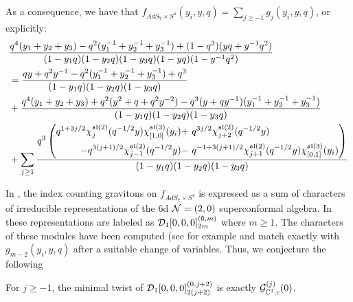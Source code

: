 \parsec[]
As a consequence, we have that $f_{AdS_7\times S^4} (y_i, y, q) = \sum_{j\geq -1} g_j (y_i, y, q)$, or explicitly:
\begin{align*}
& \frac{q^4(y_1+y_2+y_3)-q^2(y_1^{-1} + y_2^{-1} + y_3^{-1})+ (1-q^3)(yq + y^{-1} q^2)}{(1-y_1 q)(1-y_2 q)(1-y_3 q)(1-yq)(1-y^{-1} q^2)}  \\ 
& =  \frac{qy + q^2y^{-1} - q^2(y^{-1}_1+y^{-1}_2+y^{-1}_3) + q^3}{(1-y_1q) (1-y_2 q) (1-y_3 q)} \\
& +  \frac{q^4(y_1+y_2+y_3) + q^2 (y^2 + q + q^2 y^{-2}) - q^{3} (y + q y^{-1})(y_1^{-1} + y_2^{-1} + y_3^{-1})}{(1-y_1q) (1-y_2 q) (1-y_3 q)} \\
& + \sum_{j\geq 1} \frac{ q^{3} \left( \begin{aligned} q^{1 + 3 j/2} \chi^{\mathfrak{sl}(2)}_{j}(q^{-1/2} y)\chi^{\mathfrak{sl}(3)}_{[1,0]}(y_i) + \  & q^{3j/2} \chi^{\mathfrak{sl}(2)}_{j+2}(q^{-1/2} y)  \\
 - q^{3(j+1)/2} \chi^{\mathfrak{sl}(2)}_{j-1}(q^{-1/2}y) - \ & q^{-1 + 3(j+1)/2} \chi^{\mathfrak{sl}(2)}_{j+1} (q^{-1/2} y) \chi^{\mathfrak{sl}(3)}_{[0,1]}(y_i) \end{aligned} \right)}{(1-y_1 q)(1-y_2q)(1-y_3q)}
\end{align*}

In \cite[Eq. (3.22, 3.23)]{Bhattacharya:2008zy}, the index counting gravitons on $f_{AdS_7\times S^4}$ is expressed as a sum of characters of irreducible representations of the 6d $\mathcal{N} = (2,0)$ superconformal algebra. In \cite[Table 24]{cordova2016multiplets} these representations are labeled as $\mathcal{D}_1[0,0,0]^{(0,m)}_{2m}$ where $m \geq 1$. The characters of these modules have been computed (see for example \cite[Eq. (166)]{Arai_2020} and match exactly with $g_{m-2}(y_i, y, q)$ after a suitable change of variables. Thus, we conjecture the following

\begin{conj}
For $j\geq -1$, the minimal twist of $\mathcal{D}_1[0,0,0]^{(0,j+2)}_{2(j+2)}$ is exactly $\mathcal{G}^{(j)}_{\mathbb{C}^3, c}(0)$.
\end{conj}

